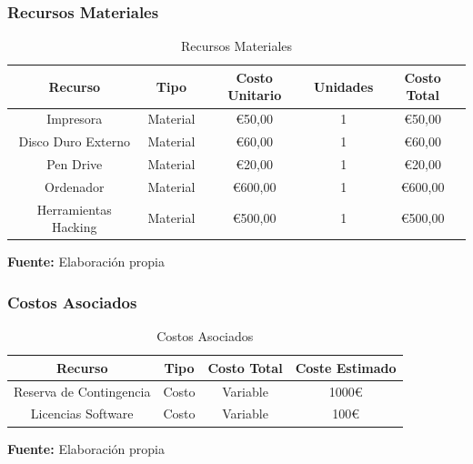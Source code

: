\documentclass[a4paper, 11pt]{article}
\begin{document}
\subsubsection{Recursos Materiales}
\begin{table}[H]
\caption{Recursos Materiales}
\centering
\renewcommand{\arraystretch}{1.5}
\begin{tabular}{|c|c|c|c|c|}
\hline
\textbf{Recurso} & \textbf{Tipo} & \textbf{Costo Unitario} & \textbf{Unidades} & \textbf{Costo Total}  \\ \hline
Impresora & Material & €50,00 & 1& €50,00  \\ \hline
Disco Duro Externo & Material &  €60,00 &1& €60,00  \\ \hline
Pen Drive & Material & €20,00 & 1& €20,00  \\ \hline
Ordenador & Material & €600,00 & 1& €600,00  \\ \hline
Herramientas Hacking & Material & €500,00 & 1& €500,00  \\ \hline
\end{tabular}
\begin{flushleft}\centering
    \footnotesize \textbf{Fuente:} Elaboración propia
\end{flushleft}   
\label{tab:recursos_materiales}
\end{table}



\subsubsection{Costos Asociados}

\begin{table}[H]
\caption{Costos Asociados}
\centering
\renewcommand{\arraystretch}{1.5}
\begin{tabular}{|c|c|c|c|}
\hline
\textbf{Recurso} & \textbf{Tipo} & \textbf{Costo Total} & \textbf{Coste Estimado}  \\ \hline
Reserva de Contingencia & Costo & Variable & 1000€  \\ \hline
Licencias Software & Costo & Variable &  100€ \\ \hline
\end{tabular}
\begin{flushleft}\centering
    \footnotesize \textbf{Fuente:} Elaboración propia
\end{flushleft}   
\label{tab:costos_asociados}
\end{table}
\end{document}
